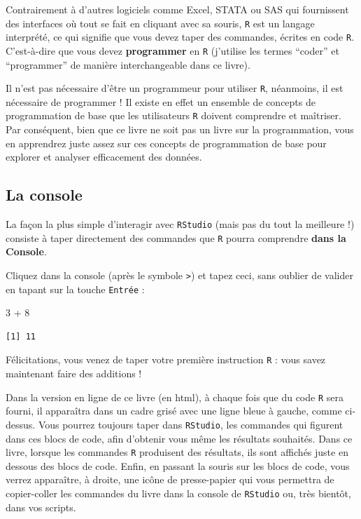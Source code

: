 \documentclass[
  letterpaper,
  DIV=11,
  numbers=noendperiod]{scrreprt}
\newenvironment{Shaded}{\begin{snugshade}}{\end{snugshade}}
\newcommand{\DecValTok}[1]{\textcolor[rgb]{0.68,0.00,0.00}{#1}}
\newcommand{\SpecialCharTok}[1]{\textcolor[rgb]{0.37,0.37,0.37}{#1}}
\begin{document}
Contrairement à d'autres logiciels comme Excel, STATA ou SAS qui
fournissent des interfaces où tout se fait en cliquant avec sa souris,
\texttt{R} est un langage interprété, ce qui signifie que vous devez
taper des commandes, écrites en code \texttt{R}. C'est-à-dire que vous
devez \textbf{programmer} en \texttt{R} (j'utilise les termes ``coder''
et ``programmer'' de manière interchangeable dans ce livre).

Il n'est pas nécessaire d'être un programmeur pour utiliser \texttt{R},
néanmoins, il est nécessaire de programmer ! Il existe en effet un
ensemble de concepts de programmation de base que les utilisateurs
\texttt{R} doivent comprendre et maîtriser. Par conséquent, bien que ce
livre ne soit pas un livre sur la programmation, vous en apprendrez
juste assez sur ces concepts de programmation de base pour explorer et
analyser efficacement des données.

\hypertarget{la-console}{%
\subsection{La console}\label{la-console}}

La façon la plus simple d'interagir avec \texttt{RStudio} (mais pas du
tout la meilleure !) consiste à taper directement des commandes que
\texttt{R} pourra comprendre \textbf{dans la Console}.

Cliquez dans la console (après le symbole \texttt{\textgreater{}}) et
tapez ceci, sans oublier de valider en tapant sur la touche
\texttt{Entrée} :

\begin{Shaded}
\begin{Highlighting}[]
\DecValTok{3} \SpecialCharTok{+} \DecValTok{8}
\end{Highlighting}
\end{Shaded}

\begin{verbatim}
[1] 11
\end{verbatim}

Félicitations, vous venez de taper votre première instruction \texttt{R}
: vous savez maintenant faire des additions !

Dans la version en ligne de ce livre (en html), à chaque fois que du
code \texttt{R} sera fourni, il apparaîtra dans un cadre grisé avec une
ligne bleue à gauche, comme ci-dessus. Vous pourrez toujours taper dans
\texttt{RStudio}, les commandes qui figurent dans ces blocs de code,
afin d'obtenir vous même les résultats souhaités. Dans ce livre, lorsque
les commandes \texttt{R} produisent des résultats, ils sont affichés
juste en dessous des blocs de code. Enfin, en passant la souris sur les
blocs de code, vous verrez apparaître, à droite, une icône de
presse-papier qui vous permettra de copier-coller les commandes du livre
dans la console de \texttt{RStudio} ou, très bientôt, dans vos scripts.
\end{document}
